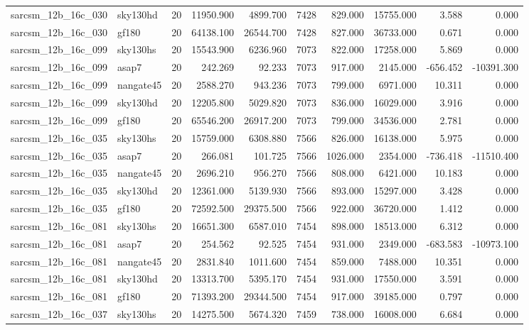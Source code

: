 \begin{tabular}{llrrrrrrrr}
sarcsm\_12b\_16c\_030 & sky130hd & 20 & 11950.900 & 4899.700 & 7428 & 829.000 & 15755.000 & 3.588 & 0.000 \\
sarcsm\_12b\_16c\_030 & gf180 & 20 & 64138.100 & 26544.700 & 7428 & 827.000 & 36733.000 & 0.671 & 0.000 \\
sarcsm\_12b\_16c\_099 & sky130hs & 20 & 15543.900 & 6236.960 & 7073 & 822.000 & 17258.000 & 5.869 & 0.000 \\
sarcsm\_12b\_16c\_099 & asap7 & 20 & 242.269 & 92.233 & 7073 & 917.000 & 2145.000 & -656.452 & -10391.300 \\
sarcsm\_12b\_16c\_099 & nangate45 & 20 & 2588.270 & 943.236 & 7073 & 799.000 & 6971.000 & 10.311 & 0.000 \\
sarcsm\_12b\_16c\_099 & sky130hd & 20 & 12205.800 & 5029.820 & 7073 & 836.000 & 16029.000 & 3.916 & 0.000 \\
sarcsm\_12b\_16c\_099 & gf180 & 20 & 65546.200 & 26917.200 & 7073 & 799.000 & 34536.000 & 2.781 & 0.000 \\
sarcsm\_12b\_16c\_035 & sky130hs & 20 & 15759.000 & 6308.880 & 7566 & 826.000 & 16138.000 & 5.975 & 0.000 \\
sarcsm\_12b\_16c\_035 & asap7 & 20 & 266.081 & 101.725 & 7566 & 1026.000 & 2354.000 & -736.418 & -11510.400 \\
sarcsm\_12b\_16c\_035 & nangate45 & 20 & 2696.210 & 956.270 & 7566 & 808.000 & 6421.000 & 10.183 & 0.000 \\
sarcsm\_12b\_16c\_035 & sky130hd & 20 & 12361.000 & 5139.930 & 7566 & 893.000 & 15297.000 & 3.428 & 0.000 \\
sarcsm\_12b\_16c\_035 & gf180 & 20 & 72592.500 & 29375.500 & 7566 & 922.000 & 36720.000 & 1.412 & 0.000 \\
sarcsm\_12b\_16c\_081 & sky130hs & 20 & 16651.300 & 6587.010 & 7454 & 898.000 & 18513.000 & 6.312 & 0.000 \\
sarcsm\_12b\_16c\_081 & asap7 & 20 & 254.562 & 92.525 & 7454 & 931.000 & 2349.000 & -683.583 & -10973.100 \\
sarcsm\_12b\_16c\_081 & nangate45 & 20 & 2831.840 & 1011.600 & 7454 & 859.000 & 7488.000 & 10.351 & 0.000 \\
sarcsm\_12b\_16c\_081 & sky130hd & 20 & 13313.700 & 5395.170 & 7454 & 931.000 & 17550.000 & 3.591 & 0.000 \\
sarcsm\_12b\_16c\_081 & gf180 & 20 & 71393.200 & 29344.500 & 7454 & 917.000 & 39185.000 & 0.797 & 0.000 \\
sarcsm\_12b\_16c\_037 & sky130hs & 20 & 14275.500 & 5674.320 & 7459 & 738.000 & 16008.000 & 6.684 & 0.000 \\

\end{tabular}
